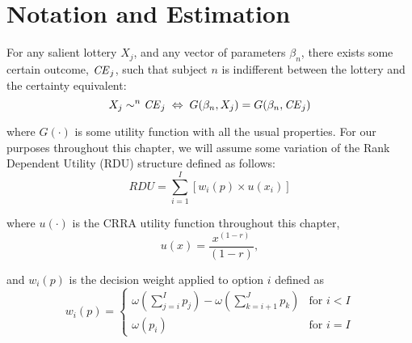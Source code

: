 \documentclass[../main.tex]{subfiles}
\begin{document}

\section{Notation and Estimation} \label{ssec:Notation}

For any salient lottery $X_j$, and any vector of parameters $\beta_n$, there exists some certain outcome, $\mathit{CE}_j$, such that subject $n$ is indifferent between the lottery and the certainty equivalent:
\begin{equation}
	\label{eq3:CE.indiff}
	X_j \sim^n {\mathit{CE}}_j \;\Leftrightarrow\; G(\beta_n,X_j) = G(\beta_n, {\mathit{CE}}_j)
\end{equation}

\noindent where $G(\cdot)$ is some utility function with all the usual properties.
For our purposes throughout this chapter, we will assume some variation of the Rank Dependent Utility (RDU) structure defined as follows:
\begin{equation}
	\label{eq3:RDU}
	RDU = \sum_{i=1}^{I} \left[ w_i(p) \times u(x_i) \right]
\end{equation}

\noindent where $u(\cdot)$ is the CRRA utility function throughout this chapter,
\begin{equation}
	\label{eq3:CRRA}
	u(x) = \frac{x^{(1-r)}}{(1-r)} ,
\end{equation}

\noindent and $w_i(p)$ is the decision weight applied to option $i$ defined as
\begin{equation}
	\label{eq3:dweight}
	w_i(p) =
	\begin{cases}
		\omega\left(\displaystyle\sum_{j=i}^I p_j\right) - \omega\left(\displaystyle\sum_{k=i+1}^J p_k\right) & \text{for } i<I \\
		\omega(p_i) & \text{for } i = I
	\end{cases}
\end{equation}
\end{document}
